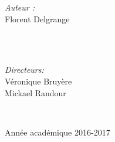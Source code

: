 \documentclass[12pt,a4paper]{report}
\theoremstyle{definition}%
\theoremstyle{remark}
\begin{document}
\begin{titlepage}
	\vspace{2cm}
	\begin{minipage}{0.4\textwidth}
		\begin{flushleft} \large
			\emph{Auteur :} \\Florent Delgrange
		\end{flushleft}
	\end{minipage}
	~
	\begin{minipage}{0.4\textwidth}
		\begin{flushright} \large
			\quad \\
			\emph{Directeurs:}\\ \quad Véronique Bruyère \\ \quad Mickael Randour\\	\vspace*{0.5cm}
		\end{flushright}

	\end{minipage}\\[5cm]


	\vspace{3.7cm}
	\begin{center}
			Ann\'ee acad\'emique 2016-2017
	\end{center}


	\vfill %

\end{titlepage}
\end{document}
